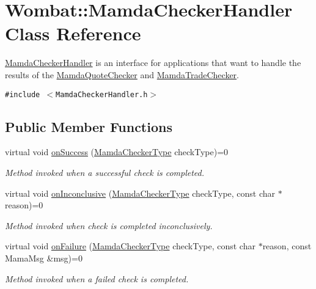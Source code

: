 \hypertarget{classWombat_1_1MamdaCheckerHandler}{
\section{Wombat::Mamda\-Checker\-Handler Class Reference}
\label{classWombat_1_1MamdaCheckerHandler}
}
\hyperlink{classWombat_1_1MamdaCheckerHandler}{Mamda\-Checker\-Handler} is an interface for applications that want to handle the results of the \hyperlink{classWombat_1_1MamdaQuoteChecker}{Mamda\-Quote\-Checker} and \hyperlink{classWombat_1_1MamdaTradeChecker}{Mamda\-Trade\-Checker}.  


{\tt \#include $<$Mamda\-Checker\-Handler.h$>$}

\subsection*{Public Member Functions}
\begin{CompactItemize}
\item 
virtual void \hyperlink{classWombat_1_1MamdaCheckerHandler_84a0fdc7401c71483159eff705b4a290}{on\-Success} (\hyperlink{namespaceWombat_f4416a38ea95baf743f07d19ac9b6a4a}{Mamda\-Checker\-Type} check\-Type)=0
\begin{CompactList}\small\item\em Method invoked when a successful check is completed. \item\end{CompactList}\item 
virtual void \hyperlink{classWombat_1_1MamdaCheckerHandler_ee8b075a8d39a266787d6262a8346ea5}{on\-Inconclusive} (\hyperlink{namespaceWombat_f4416a38ea95baf743f07d19ac9b6a4a}{Mamda\-Checker\-Type} check\-Type, const char $\ast$reason)=0
\begin{CompactList}\small\item\em Method invoked when check is completed inconclusively. \item\end{CompactList}\item 
virtual void \hyperlink{classWombat_1_1MamdaCheckerHandler_42e88268913899c069f2b91dd8ad7399}{on\-Failure} (\hyperlink{namespaceWombat_f4416a38ea95baf743f07d19ac9b6a4a}{Mamda\-Checker\-Type} check\-Type, const char $\ast$reason, const Mama\-Msg \&msg)=0
\begin{CompactList}\small\item\em Method invoked when a failed check is completed. \item\end{CompactList}\end{CompactItemize}


